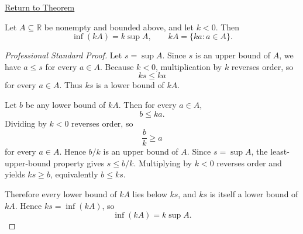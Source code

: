 \newpage
{}
\label{prf:negative-scalar-mult-infimum}

\begin{remark*}[Return]
\hyperref[thm:negative-scalar-mult-infimum]{Return to Theorem}
\end{remark*}

\begin{theorem*}
Let $A\subseteq\mathbb{R}$ be nonempty and bounded above, and let $k<0$.
Then
\[
  \inf(kA)=k\sup A,
  \qquad
  kA=\{ka:a\in A\}.
\]
\end{theorem*}

\begin{proof}[Professional Standard Proof]
\LRAProofBodyStart
Let \(s=\sup A\). Since \(s\) is an upper bound of \(A\), we have \(a\le s\)
for every \(a\in A\). Because \(k<0\), multiplication by \(k\) reverses order,
so
\[
  ks\le ka
\]
for every \(a\in A\). Thus \(ks\) is a lower bound of \(kA\).

Let \(b\) be any lower bound of \(kA\). Then for every \(a\in A\),
\[
  b\le ka.
\]
Dividing by \(k<0\) reverses order, so
\[
  \frac{b}{k}\ge a
\]
for every \(a\in A\). Hence \(b/k\) is an upper bound of \(A\). Since
\(s=\sup A\), the least-upper-bound property gives \(s\le b/k\). Multiplying
by \(k<0\) reverses order and yields \(ks\ge b\), equivalently \(b\le ks\).

Therefore every lower bound of \(kA\) lies below \(ks\), and \(ks\) is itself
a lower bound of \(kA\). Hence \(ks=\inf(kA)\), so
\[
  \inf(kA)=k\sup A.
\]
\end{proof}

